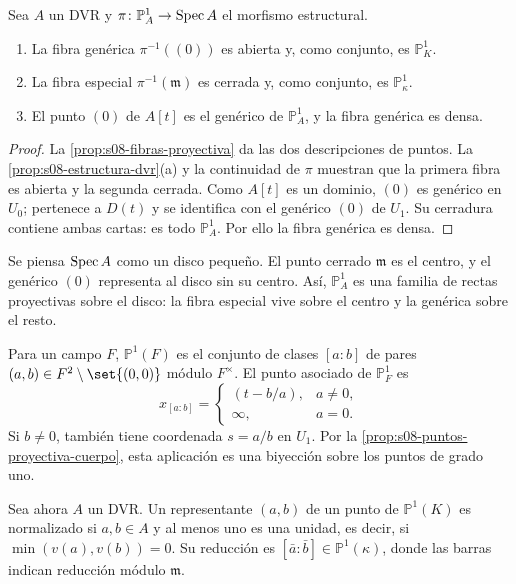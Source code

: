 \begin{prop}
\label{prop:s08-fibras-dvr}
\label{ejem:s08-proyectiva-dvr}
Sea $A$ un DVR y $\pi\colon \mathbb P_A^1\to\operatorname{Spec} A$ el morfismo estructural.
\begin{enumerate}[label=(\alph*)]
\item La fibra genérica $\pi^{-1}((0))$ es abierta y, como conjunto, es $\mathbb P_K^1$.
\item La fibra especial $\pi^{-1}(\mathfrak m)$ es cerrada y, como conjunto, es $\mathbb P_\kappa^1$.
\item El punto $(0)$ de $A[t]$ es el genérico de $\mathbb P_A^1$, y la fibra genérica es densa.
\end{enumerate}
\end{prop}
\begin{proof}
La \cref{prop:s08-fibras-proyectiva} da las dos descripciones de puntos. La \cref{prop:s08-estructura-dvr}(a) y la continuidad de $\pi$ muestran que la primera fibra es abierta y la segunda cerrada. Como $A[t]$ es un dominio, $(0)$ es genérico en $U_0$; pertenece a $D(t)$ y se identifica con el genérico $(0)$ de $U_1$. Su cerradura contiene ambas cartas: es todo $\mathbb P_A^1$. Por ello la fibra genérica es densa.
\end{proof}

\begin{obs}[El disco]
\label{obs:s08-disco-dvr}
Se piensa $\operatorname{Spec} A$ como un disco pequeño. El punto cerrado $\mathfrak m$ es el centro, y el genérico $(0)$ representa al disco sin su centro. Así, $\mathbb P_A^1$ es una familia de rectas proyectivas sobre el disco: la fibra especial vive sobre el centro y la genérica sobre el resto.
\end{obs}

\begin{defi}
\label{defi:s08-reduccion}
Para un campo $F$, $\mathbb P^1(F)$ es el conjunto de clases $[a:b]$ de pares $(a,b)\in F^2\setminus\set{(0,0)}$ módulo $F^\times$. El punto asociado de $\mathbb P_F^1$ es
\[
x_{[a:b]}=
\begin{cases}
(t-b/a),&a\ne0,\\
\infty,&a=0.
\end{cases}
\]
Si $b\ne0$, también tiene coordenada $s=a/b$ en $U_1$. Por la \cref{prop:s08-puntos-proyectiva-cuerpo}, esta aplicación es una biyección sobre los puntos de grado uno.

Sea ahora $A$ un DVR. Un representante $(a,b)$ de un punto de $\mathbb P^1(K)$ es normalizado si $a,b\in A$ y al menos uno es una unidad, es decir, si $\min(v(a),v(b))=0$. Su reducción es $[\bar a:\bar b]\in\mathbb P^1(\kappa)$, donde las barras indican reducción módulo $\mathfrak m$.
\end{defi}

